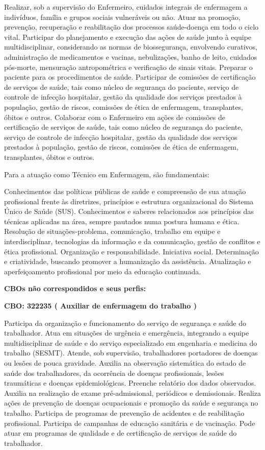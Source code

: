 \documentclass[
]{article}
\begin{document}
Realizar, sob a supervisão do Enfermeiro, cuidados integrais de
enfermagem a indivíduos, família e grupos sociais vulneráveis ou não.
Atuar na promoção, prevenção, recuperação e reabilitação dos processos
saúde-doença em todo o ciclo vital. Participar do planejamento e
execução das ações de saúde junto à equipe multidisciplinar,
considerando as normas de biossegurança, envolvendo curativos,
administração de medicamentos e vacinas, nebulizações, banho de leito,
cuidados pós-morte, mensuração antropométrica e verificação de sinais
vitais. Preparar o paciente para os procedimentos de saúde. Participar
de comissões de certificação de serviços de saúde, tais como núcleo de
segurança do paciente, serviço de controle de infecção hospitalar,
gestão da qualidade dos serviços prestados à população, gestão de
riscos, comissões de ética de enfermagem, transplantes, óbitos e outros.
Colaborar com o Enfermeiro em ações de comissões de certificação de
serviços de saúde, tais como núcleo de segurança do paciente, serviço de
controle de infecção hospitalar, gestão da qualidade dos serviços
prestados à população, gestão de riscos, comissões de ética de
enfermagem, transplantes, óbitos e outros.

Para a atuação como Técnico em Enfermagem, são fundamentais:

Conhecimentos das políticas públicas de saúde e compreensão de sua
atuação profissional frente às diretrizes, princípios e estrutura
organizacional do Sistema Único de Saúde (SUS). Conhecimentos e saberes
relacionados aos princípios das técnicas aplicadas na área, sempre
pautados numa postura humana e ética. Resolução de situações-problema,
comunicação, trabalho em equipe e interdisciplinar, tecnologias da
informação e da comunicação, gestão de conflitos e ética profissional.
Organização e responsabilidade. Iniciativa social. Determinação e
criatividade, buscando promover a humanização da assistência.
Atualização e aperfeiçoamento profissional por meio da educação
continuada.

\textbf{CBOs não correspondidos e seus perfis:}

\textbf{CBO: 322235  ( Auxiliar de enfermagem do trabalho )}

Participa da organização e funcionamento do serviço de segurança e saúde
do trabalhador. Atua em situações de urgência e emergência, integrando a
equipe multidisciplinar de saúde e do serviço especializado em
engenharia e medicina do trabalho (SESMT). Atende, sob supervisão,
trabalhadores portadores de doenças ou lesões de pouca gravidade.
Auxilia na observação sistemática do estado de saúde dos trabalhadores,
da ocorrência de doenças profissionais, lesões traumáticas e doenças
epidemiológicas. Preenche relatório dos dados observados. Auxilia na
realização de exame pré-admissional, periódicos e demissionais. Realiza
ações de prevenção de doenças ocupacionais e promoção da saúde e
segurança no trabalho. Participa de programas de prevenção de acidentes
e de reabilitação profissional. Participa de campanhas de educação
sanitária e de vacinação. Pode atuar em programas de qualidade e de
certificação de serviços de saúde do trabalhador.
\end{document}
